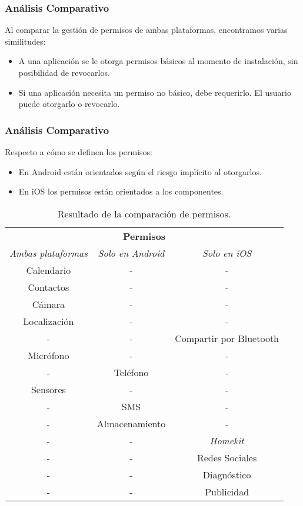 \begin{frame}
 \frametitle{Análisis Comparativo}
Al comparar la gestión de permisos de ambas plataformas, encontramos varias similitudes:\pause
 \begin{itemize}[<+->]
  \item A una aplicación se le otorga permisos básicos al momento de instalación, sin posibilidad de revocarlos.
  \item Si una aplicación necesita un permiso no básico, debe requerirlo. El usuario puede otorgarlo o revocarlo.
 \end{itemize}
\end{frame}
\begin{frame}
 \frametitle{Análisis Comparativo}
Respecto a cómo se definen los permisos: \pause
 \begin{itemize}
  \item En Android están orientados según el riesgo implícito al otorgarlos.\pause
  \item En iOS los permisos están orientados a los componentes.\pause
 \end{itemize} 
  \begin{tiny}
  \begin{table}[H]
    \centering
	\begin{tabular}{c c c}
		\hline
		\multicolumn{3}{c}{\textbf{Permisos}} \\
		\emph{Ambas plataformas} 	& \emph{Solo en Android}	& \emph{Solo en iOS} \\ \hline    \hline
		Calendario	& -		& -	\\						
		Contactos	& -				& - \\						
		Cámara		& -				& -	\\						
		Localización& -				& -	\\						
		-			& -				& Compartir por Bluetooth\\ 
		Micrófono   & -				& - \\						
		-			& Teléfono		& -	\\						
		Sensores    & -    			& - \\						
		-			& SMS			& - \\						
		-			& Almacenamiento& - \\						
		-			& -				& \emph{Homekit} \\			
		-			& -				& Redes Sociales \\        	
		-			& -				& Diagnóstico \\        			
		-			& -				& Publicidad \\    			\hline
	\end{tabular}
	\caption{Resultado de la comparación de permisos.}
   \end{table}
   	\end{tiny}
\end{frame}
